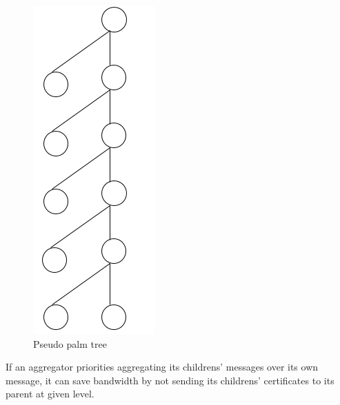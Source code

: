 	\begin{figure}[hp]
		\centering
		\includegraphics[scale = 0.3]{images/pseudo-palm-tree}
		\caption{Pseudo palm tree}
		\label{fig:pseudo}
	\end{figure}

	\begin{theorem}
		If an aggregator priorities aggregating its childrens' messages over its own message, it can save bandwidth by not sending its childrens' certificates to its parent at given level.
	\end{theorem}

